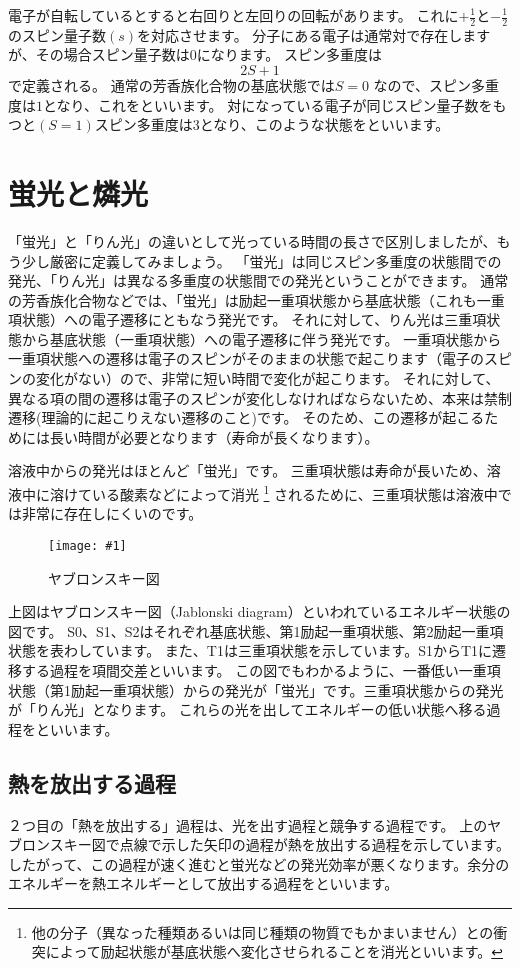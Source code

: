 \documentclass[a4paper,papersize,dvipdfmx]{jsarticle}
\newcommand{\piccap}[3]{\begin{figure}[H] \centering \texttt{[image: \#1]} \caption{#3} \label{fig {#1}} \end{figure}} %
\begin{document}
電子が自転しているとすると右回りと左回りの回転があります。
これに$+\frac{1}{2}$と$-\frac{1}{2}$のスピン量子数$(s)$を対応させます。
分子にある電子は通常対で存在しますが、その場合スピン量子数は$0$になります。
スピン多重度は
\[2S+1\]
で定義される。
通常の芳香族化合物の基底状態では$S=0$ なので、スピン多重度は$1$となり、これをといいます。
対になっている電子が同じスピン量子数をもつと$(S=1)$スピン多重度は$3$となり、このような状態をといいます。

\section{蛍光と燐光}
「蛍光」と「りん光」の違いとして光っている時間の長さで区別しましたが、もう少し厳密に定義してみましょう。
「蛍光」は同じスピン多重度の状態間での発光、「りん光」は異なる多重度の状態間での発光ということができます。
通常の芳香族化合物などでは、「蛍光」は励起一重項状態から基底状態（これも一重項状態）への電子遷移にともなう発光です。
それに対して、りん光は三重項状態から基底状態（一重項状態）への電子遷移に伴う発光です。
一重項状態から一重項状態への遷移は電子のスピンがそのままの状態で起こります（電子のスピンの変化がない）ので、非常に短い時間で変化が起こります。
それに対して、異なる項の間の遷移は電子のスピンが変化しなければならないため、本来は禁制遷移(理論的に起こりえない遷移のこと)です。
そのため、この遷移が起こるためには長い時間が必要となります（寿命が長くなります）。

溶液中からの発光はほとんど「蛍光」です。
三重項状態は寿命が長いため、溶液中に溶けている酸素などによって消光
\footnote{他の分子（異なった種類あるいは同じ種類の物質でもかまいません）との衝突によって励起状態が基底状態へ変化させられることを消光といいます。}
されるために、三重項状態は溶液中では非常に存在しにくいのです。

\piccap{image2/jabr.png}{7}{ヤブロンスキー図}

上図はヤブロンスキー図（Jablonski diagram）といわれているエネルギー状態の図です。
S0、S1、S2はそれぞれ基底状態、第1励起一重項状態、第2励起一重項状態を表わしています。
また、T1は三重項状態を示しています。S1からT1に遷移する過程を項間交差といいます。
この図でもわかるように、一番低い一重項状態（第1励起一重項状態）からの発光が「蛍光」です。三重項状態からの発光が「りん光」となります。
これらの光を出してエネルギーの低い状態へ移る過程をといいます。


\subsection{熱を放出する過程}
２つ目の「熱を放出する」過程は、光を出す過程と競争する過程です。
上のヤブロンスキー図で点線で示した矢印の過程が熱を放出する過程を示しています。
したがって、この過程が速く進むと蛍光などの発光効率が悪くなります。余分のエネルギーを熱エネルギーとして放出する過程をといいます。
\end{document}
